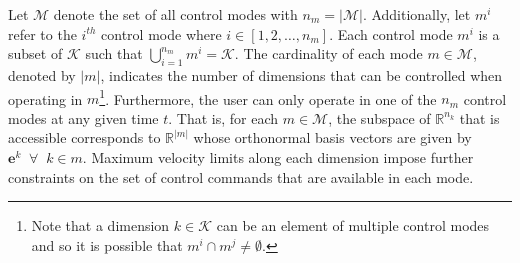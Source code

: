 \documentclass[letterpaper, 10 pt, conference]{ieeeconf}  %
\newcommand{\norm}[1]{\left\lVert#1\right\rVert}
\begin{document}
Let $\mathcal{M}$ denote the set of all control modes with $n_m = \vert\mathcal{M}\vert$. Additionally, let $m^i$ refer to the $i^{th}$ control mode where $i \in [1,2,\dots,n_m]$. Each control mode $m^i$ is a subset of $\mathcal{K}$ such that $\bigcup\limits_{i=1}^{n_m} m^i = \mathcal{K}$. The cardinality of each mode $m \in \mathcal{M}$, denoted by $\vert m \vert$, indicates the number of dimensions that can be controlled when operating in $m$\footnote{Note that a dimension $k \in \mathcal{K}$ can be an element of multiple control modes and so it is possible that $m^i \cap m^j \neq \emptyset$.}. Furthermore, the user can only operate in one of the $n_m$ control modes at any given time $t$. That is, for each $m \in \mathcal{M}$, the subspace of $\mathbb{R}^{n_k}$ that is accessible corresponds to $\mathbb{R}^{\vert m \vert}$ whose orthonormal basis vectors are given by $\boldsymbol{e}^k \;\; \forall \;\; k \in m$. Maximum velocity limits along each dimension impose further constraints on the set of control commands that are available in each mode. 
\end{document}

